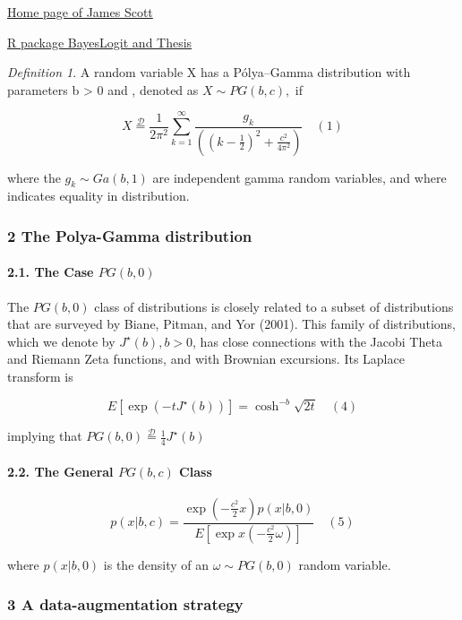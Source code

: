 \documentclass[
]{article}
\begin{document}
\href{https://jgscott.github.io/}{Home page of James Scott}

\href{https://github.com/jwindle/BayesLogit}{R package BayesLogit and
Thesis}

\emph{Definition 1}. A random variable X has a Pólya--Gamma distribution
with parameters b \textgreater{} 0 and , denoted as \(X\sim PG(b, c),\)
if

\[X\overset{\mathcal{D}}{=}\frac1{2\pi^2}\sum_{k=1}^\infty\frac{g_k}{((k-\frac12)^2 + \frac{c^2}{4\pi^2})}\quad (1)\]

where the \(g_k ∼ Ga(b, 1)\) are independent gamma random variables, and
where indicates equality in distribution.

\hypertarget{the-polya-gamma-distribution}{%
\subsubsection{2 The Polya-Gamma
distribution}\label{the-polya-gamma-distribution}}

\hypertarget{the-case-pgb0}{%
\paragraph{\texorpdfstring{2.1. The Case
\(PG(b,0)\)}{2.1. The Case PG(b,0)}}\label{the-case-pgb0}}

The \(PG(b,0)\) class of distributions is closely related to a subset of
distributions that are surveyed by Biane, Pitman, and Yor (2001). This
family of distributions, which we denote by \(J^\star(b), b>0\), has
close connections with {the Jacobi Theta and Riemann Zeta functions, and
with Brownian excursions}. Its Laplace transform is

\[E[\exp(-tJ^\star(b))]=\cosh^{-b}\sqrt{2t}\quad (4)\]

implying that \(PG(b,0)\overset{\mathcal{D}}{=}\frac14J^\star(b)\)

\hypertarget{the-general-pgbc-class}{%
\paragraph{\texorpdfstring{2.2. The General \(PG(b,c)\)
Class}{2.2. The General PG(b,c) Class}}\label{the-general-pgbc-class}}

\[p(x|b,c)=\frac{\exp(-\frac{c^2}2x) p(x|b,0)}{E[\exp x(-\frac{c^2}2\omega)]}\quad (5)\]

where \(p(x|b,0)\) is the density of an \(\omega\sim PG(b,0)\) random
variable.

\hypertarget{a-data-augmentation-strategy}{%
\subsubsection{3 A data-augmentation
strategy}\label{a-data-augmentation-strategy}}
\end{document}
